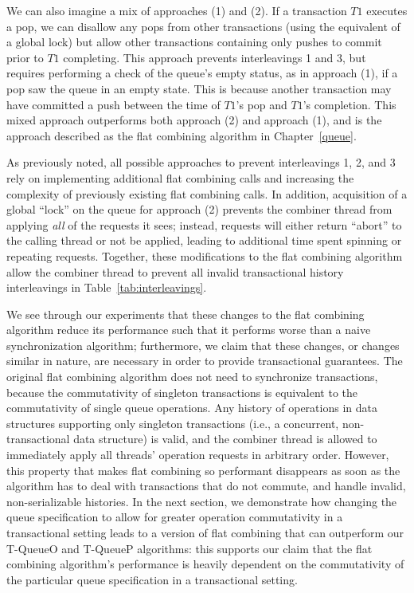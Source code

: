 We can also imagine a mix of approaches (1) and (2). If a transaction $T1$ executes a pop, we can disallow any pops from other transactions (using the equivalent of a global lock) but allow other transactions containing only pushes to commit prior to $T1$ completing. This approach prevents interleavings 1 and 3, but requires performing a check of the queue's empty status, as in approach (1), if a pop saw the queue in an empty state. This is because another transaction may have committed a push between the time of $T1$'s pop and $T1$'s completion. This mixed approach outperforms both approach (2) and approach (1), and is the approach described as the flat combining algorithm in Chapter~\ref{queue}. 

As previously noted, all possible approaches to prevent interleavings 1, 2, and 3 rely on implementing additional flat combining calls and increasing the complexity of previously existing flat combining calls. In addition, acquisition of a global ``lock'' on the queue for approach (2) prevents the combiner thread from applying \emph{all} of the requests it sees; instead, requests will either return ``abort'' to the calling thread or not be applied, leading to additional time spent spinning or repeating requests. Together, these modifications to the flat combining algorithm allow the combiner thread to prevent all invalid transactional history interleavings in Table~\ref{tab:interleavings}.

We see through our experiments that these changes to the flat combining algorithm reduce its performance such that it performs worse than a naive synchronization algorithm; furthermore, we claim that these changes, or changes similar in nature, are necessary in order to provide transactional guarantees. The original flat combining algorithm does not need to synchronize transactions, because the commutativity of singleton transactions is equivalent to the commutativity of single queue operations. Any history of operations in data structures supporting only singleton transactions (i.e., a concurrent, non-transactional data structure) is valid, and the combiner thread is allowed to immediately apply all threads' operation requests in arbitrary order. However, this property that makes flat combining so performant disappears as soon as the algorithm has to deal with transactions that do not commute, and handle invalid, non-serializable histories. In the next section, we demonstrate how changing the queue specification to allow for greater operation commutativity in a transactional setting leads to a version of flat combining that can outperform our T-QueueO and T-QueueP algorithms: this supports our claim that the flat combining algorithm's performance is heavily dependent on the commutativity of the particular queue specification in a transactional setting.
